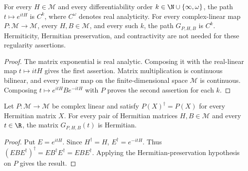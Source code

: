 \begin{theorem}
    \label{thm:projected_generator_smooth}
    \leanok
    For every $H\in\mathcal M$ and every differentiability order
    $k\in\N\cup\{\infty,\omega\}$, the path $t\mapsto e^{itH}$ is
    $C^k$, where $C^\omega$ denotes real analyticity.
    For every complex-linear map $P:\mathcal M\to\mathcal M$,
    every $H,B\in\mathcal M$, and every such $k$, the path
    $G_{P,H,B}$ is $C^k$. Hermiticity, Hermitian preservation, and
    contractivity are not needed for these regularity assertions.
\end{theorem}
\begin{proof}\leanok
    The matrix exponential is real analytic. Composing it with the
    real-linear map $t\mapsto itH$ gives the first assertion.
    Matrix multiplication is continuous bilinear, and every linear map
    on the finite-dimensional space $\mathcal M$ is continuous.
    Composing $t\mapsto e^{itH}Be^{-itH}$ with $P$ proves the second
    assertion for each $k$.
\end{proof}

\begin{theorem}
    \label{thm:projected_generator_hermitian}
    \leanok
    Let $P:\mathcal M\to\mathcal M$ be complex linear and satisfy
    $P(X)^\dagger=P(X)$ for every Hermitian matrix $X$.
    For every pair of Hermitian matrices $H,B\in\mathcal M$ and every
    $t\in\R$, the matrix $G_{P,H,B}(t)$ is Hermitian.
\end{theorem}
\begin{proof}\leanok
    Put $E=e^{itH}$. Since $H^\dagger=H$,
    $E^\dagger=e^{-itH}$. Thus
    $(EBE^\dagger)^\dagger=EB^\dagger E^\dagger=EBE^\dagger$.
    Applying the Hermitian-preservation hypothesis on $P$ gives the
    result.
\end{proof}

